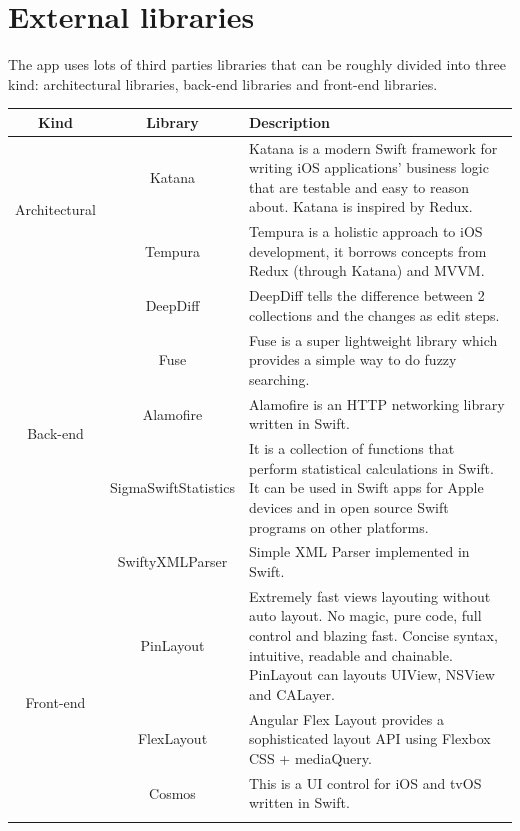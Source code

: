 \documentclass[a4paper, 11pt, parskip=half]{scrreprt}
\theoremstyle{definition}
\begin{document}
\section{External libraries}

The app uses lots of third parties libraries that can be roughly divided into three kind: architectural libraries, back-end libraries and front-end libraries.

\begin{table}[h]
    \centering
    \def\arraystretch{1.3}
    \begin{tabular}{|c|c|m{9cm}|}
        \hline
        \textbf{Kind} & \textbf{Library} & \textbf{Description} \\ \hline
        \multirow{2}{*}{Architectural} & Katana & Katana is a modern Swift framework for writing iOS applications' business logic that are testable and easy to reason about. Katana is inspired by Redux. \\ \cline{2-3}
        & Tempura & Tempura is a holistic approach to iOS development, it borrows concepts from Redux (through Katana) and MVVM. \\ \hline
        \multirow{5}{*}{Back-end} & DeepDiff & DeepDiff tells the difference between 2 collections and the changes as edit steps. \\ \cline{2-3}
        & Fuse & Fuse is a super lightweight library which provides a simple way to do fuzzy searching. \\ \cline{2-3}
        & Alamofire & Alamofire is an HTTP networking library written in Swift. \\ \cline{2-3}
        & SigmaSwiftStatistics & It is a collection of functions that perform statistical calculations in Swift. It can be used in Swift apps for Apple devices and in open source Swift programs on other platforms. \\ \cline{2-3}
        & SwiftyXMLParser & Simple XML Parser implemented in Swift. \\ \hline
        \multirow{7}{*}{Front-end} & PinLayout & Extremely fast views layouting without auto layout. No magic, pure code, full control and blazing fast. Concise syntax, intuitive, readable and chainable. PinLayout can layouts UIView, NSView and CALayer. \\ \cline{2-3}
        & FlexLayout & Angular Flex Layout provides a sophisticated layout API using Flexbox CSS + mediaQuery. \\ \cline{2-3}
        & Cosmos & This is a UI control for iOS and tvOS written in Swift. \\ \cline{2-3}

\end{tabular}
\end{table}
\end{document}
